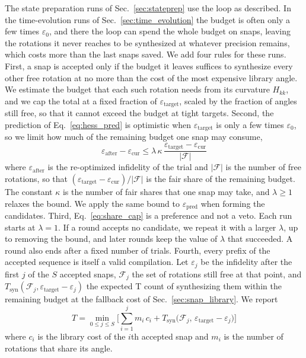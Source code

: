 The state preparation runs of Sec.~\ref{sec:stateprep} use the loop as described. In the time-evolution runs of Sec.~\ref{sec:time_evolution} the budget is often only a few times $\varepsilon_0$, and there the loop can spend the whole budget on snaps, leaving the rotations it never reaches to be synthesized at whatever precision remains, which costs more than the last snaps saved. We add four rules for these runs. First, a snap is accepted only if the budget it leaves suffices to synthesize every other free rotation at no more than the cost of the most expensive library angle. We estimate the budget that each such rotation needs from its curvature $H_{kk}$, and we cap the total at a fixed fraction of $\varepsilon_{\mathrm{target}}$, scaled by the fraction of angles still free, so that it cannot exceed the budget at tight targets. Second, the prediction of Eq.~\eqref{eq:hess_pred} is optimistic when $\varepsilon_{\mathrm{target}}$ is only a few times $\varepsilon_0$, so we limit how much of the remaining budget one snap may consume,
\begin{equation}
\varepsilon_{\mathrm{after}} - \varepsilon_{\mathrm{cur}} \leq \lambda\, \kappa\, \frac{\varepsilon_{\mathrm{target}} - \varepsilon_{\mathrm{cur}}}{|\mathcal{F}|}
\label{eq:share_cap}
\end{equation}
where $\varepsilon_{\mathrm{after}}$ is the re-optimized infidelity of the trial and $|\mathcal{F}|$ is the number of free rotations, so that $(\varepsilon_{\mathrm{target}} - \varepsilon_{\mathrm{cur}})/|\mathcal{F}|$ is the fair share of the remaining budget. The constant $\kappa$ is the number of fair shares that one snap may take, and $\lambda \geq 1$ relaxes the bound. We apply the same bound to $\varepsilon_{\mathrm{pred}}$ when forming the candidates. Third, Eq.~\eqref{eq:share_cap} is a preference and not a veto. Each run starts at $\lambda = 1$. If a round accepts no candidate, we repeat it with a larger $\lambda$, up to removing the bound, and later rounds keep the value of $\lambda$ that succeeded. A round also ends after a fixed number of trials. Fourth, every prefix of the accepted sequence is itself a valid compilation. Let $\varepsilon_j$ be the infidelity after the first $j$ of the $S$ accepted snaps, $\mathcal{F}_j$ the set of rotations still free at that point, and $T_{\mathrm{syn}}(\mathcal{F}_j, \varepsilon_{\mathrm{target}} - \varepsilon_j)$ the expected T count of synthesizing them within the remaining budget at the fallback cost of Sec.~\ref{sec:snap_library}. We report
\begin{equation}
T = \min_{0 \leq j \leq S} \Big[ \sum_{i=1}^{j} m_i\, c_i + T_{\mathrm{syn}}\big(\mathcal{F}_j,\, \varepsilon_{\mathrm{target}} - \varepsilon_j\big) \Big]
\label{eq:prefix}
\end{equation}
where $c_i$ is the library cost of the $i$th accepted snap and $m_i$ is the number of rotations that share its angle. 


